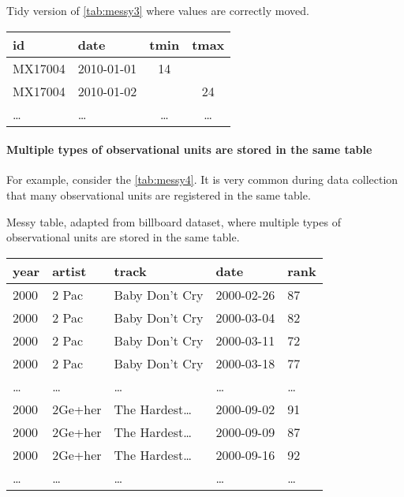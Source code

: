 \begin{tablebox}[label=tab:tidy3b]{Tidy version of \cref{tab:messy3} where values are correctly moved.}
  \centering
  \begin{tabular}{llcc}
    \toprule
    id & date & tmin & tmax \\
    \midrule
    MX17004 & 2010-01-01 & 14 &    \\
    MX17004 & 2010-01-02 &    & 24 \\
    \dots & \dots & \dots & \dots \\
    \bottomrule
  \end{tabular}
\end{tablebox}


\paragraph{Multiple types of observational units are stored in the same table}  For
example, consider the \cref{tab:messy4}.  It is very common during data collection that
many observational units are registered in the same table.

\begin{tablebox}[label=tab:messy4]{Messy table, adapted from billboard dataset, where multiple types of observational units are stored in the same table.}
  \centering
  \begin{tabular}{lllll}
    \toprule
    year & artist & track & date & rank \\
    \midrule
    2000 & 2 Pac & Baby Don't Cry & 2000-02-26 & 87 \\
    2000 & 2 Pac & Baby Don't Cry & 2000-03-04 & 82 \\
    2000 & 2 Pac & Baby Don't Cry & 2000-03-11 & 72 \\
    2000 & 2 Pac & Baby Don't Cry & 2000-03-18 & 77 \\
    \dots & \dots & \dots & \dots & \dots \\
    2000 & 2Ge+her & The Hardest\dots & 2000-09-02 & 91 \\
    2000 & 2Ge+her & The Hardest\dots & 2000-09-09 & 87 \\
    2000 & 2Ge+her & The Hardest\dots & 2000-09-16 & 92 \\
    \dots & \dots & \dots & \dots & \dots \\
    \bottomrule
  \end{tabular}
\end{tablebox}

